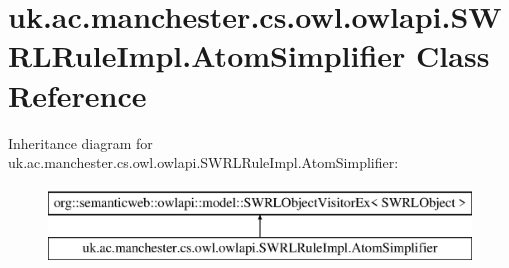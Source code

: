 \hypertarget{classuk_1_1ac_1_1manchester_1_1cs_1_1owl_1_1owlapi_1_1_s_w_r_l_rule_impl_1_1_atom_simplifier}{\section{uk.\-ac.\-manchester.\-cs.\-owl.\-owlapi.\-S\-W\-R\-L\-Rule\-Impl.\-Atom\-Simplifier Class Reference}
\label{classuk_1_1ac_1_1manchester_1_1cs_1_1owl_1_1owlapi_1_1_s_w_r_l_rule_impl_1_1_atom_simplifier}
}
Inheritance diagram for uk.\-ac.\-manchester.\-cs.\-owl.\-owlapi.\-S\-W\-R\-L\-Rule\-Impl.\-Atom\-Simplifier\-:\begin{figure}[H]
\begin{center}
\leavevmode
\includegraphics[height=2.000000cm]{classuk_1_1ac_1_1manchester_1_1cs_1_1owl_1_1owlapi_1_1_s_w_r_l_rule_impl_1_1_atom_simplifier}
\end{center}
\end{figure}
